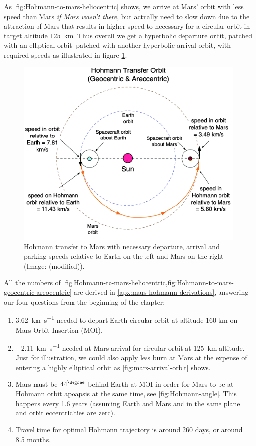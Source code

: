 As \cref{fig:Hohmann-to-mars-heliocentric} shows, we arrive at Mars' orbit with less speed than Mars \emph{if Mars wasn't there}, but actually need to slow down due to the attraction of Mars that results in higher speed to necessary for a circular orbit in target altitude \SI{125}{\km}. Thus overall we get a hyperbolic departure orbit, patched with an elliptical orbit, patched with another hyperbolic arrival orbit, with required speeds as illustrated in figure \cref{fig:Hohmann-to-mars-geocentric-areocentric}.

\begin{figure}[ht]
    \centering
    \includegraphics[width=0.7\linewidth]{fig/Hohmann-to-mars-geocentric-areocentric.png}
    \caption{Hohmann transfer to Mars with necessary departure, arrival and parking speeds relative to Earth on the left and Mars on the right (Image: \cite[p.~133]{Rapp2016} (modified)).}
    \label{fig:Hohmann-to-mars-geocentric-areocentric}
\end{figure}

All the numbers of \cref{fig:Hohmann-to-mars-heliocentric,fig:Hohmann-to-mars-geocentric-areocentric} are derived in \cref{apx:mars-hohmann-derivations}, answering our four questions from the beginning of the chapter:

\begin{enumerate}
	\item \SI{3.62}{\km\per\s} needed to depart Earth circular orbit at altitude 160 km on Mars Orbit Insertion (MOI).
	\item \SI{-2.11}{\km\per\s} needed at Mars arrival for circular orbit at \SI{125}{\km} altitude. Just for illustration, we could also apply less burn at Mars at the expense of entering a highly elliptical orbit as \cref{fig:mars-arrival-orbit} shows.
	\item Mars must be $44^\degree$ behind Earth at MOI in order for Mars to be at Hohmann orbit apoapsis at the same time, see \cref{fig:Hohmann-angle}. This happens every 1.6 years \cite{Odenwald} (assuming Earth and Mars and in the same plane and orbit eccentricities are zero).
	\item Travel time for optimal Hohmann trajectory is around 260 days, or around 8.5 months.
\end{enumerate}

